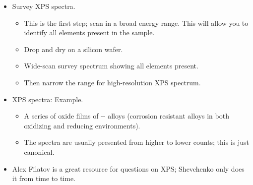 \documentclass[../notes.tex]{subfiles}
\begin{document}
\begin{itemize}
\begin{itemize}
\begin{itemize}
            \item To separate signals from Auger electrons and photoelectrons: The binding energy does not depend on the energy of the incoming X-rays, but the Augers will be affected.
        \end{itemize}
        \item XPS is not destructive in a classical way; however, it can be coupled with an etching technique that removes the topic atomic layer.
        \begin{itemize}
            \item Can induce possible artifiacts (e.g., induced chemical changes, the preferential sputtering of elements, surface roughening, etc.).
        \end{itemize}
        \item The largest size for a monochromatic beam of X-rays is \SIrange{1}{5}{\milli\meter}.
        \begin{itemize}
            \item Non-monochromatic beam: \SIrange{10}{50}{\milli\meter}.
        \end{itemize}
        \item XPS with synchrotron radiation: Down to $\sim\SI{200}{\nano\meter}$.
    \end{itemize}
    \item Survey XPS spectra.
    \begin{itemize}
        \item This is the first step; scan in a broad energy range. This will allow you to identify all elements present in the sample.
        \item Drop and dry on a silicon wafer.
        \item Wide-scan survey spectrum showing all elements present.
        \item Then narrow the range for high-resolution XPS spectrum.
    \end{itemize}
    \item XPS spectra: Example.
    \begin{itemize}
        \item A series of oxide films of -- alloys (corrosion resistant alloys in both oxidizing and reducing environments).
        \item The spectra are usually presented from higher to lower counts; this is just canonical.
    \end{itemize}
    \item Alex Filatov is a great resource for questions on XPS; Shevchenko only does it from time to time.

\end{itemize}
\end{document}
